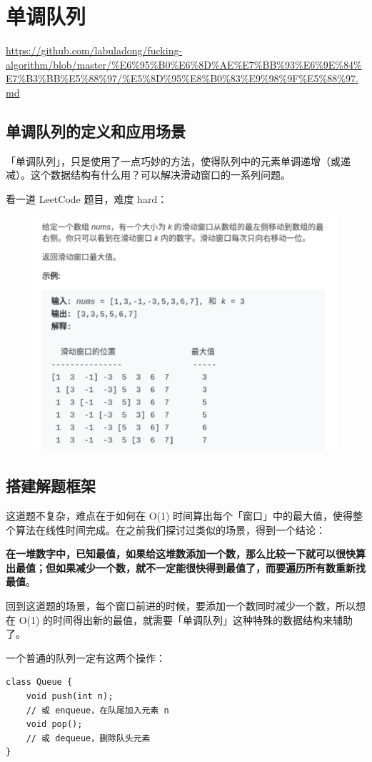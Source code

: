 \documentclass[12pt]{article}
\begin{document}
\section{单调队列}
\url{https://github.com/labuladong/fucking-algorithm/blob/master/%E6%95%B0%E6%8D%AE%E7%BB%93%E6%9E%84%E7%B3%BB%E5%88%97/%E5%8D%95%E8%B0%83%E9%98%9F%E5%88%97.md}

\subsection{单调队列的定义和应用场景}
「单调队列」，只是使用了一点巧妙的方法，使得队列中的元素单调递增（或递减）。这个数据结构有什么用？可以解决滑动窗口的一系列问题。

看一道 LeetCode 题目，难度 hard：
\begin{figure}[H]
    \centering
    \includegraphics[width=.8\textwidth]{fig/monotonic_queue_1.png}
\end{figure}

\subsection{搭建解题框架}
这道题不复杂，难点在于如何在 O(1) 时间算出每个「窗口」中的最大值，使得整个算法在线性时间完成。在之前我们探讨过类似的场景，得到一个结论：

\textbf{在一堆数字中，已知最值，如果给这堆数添加一个数，那么比较一下就可以很快算出最值；但如果减少一个数，就不一定能很快得到最值了，而要遍历所有数重新找最值}。

回到这道题的场景，每个窗口前进的时候，要添加一个数同时减少一个数，所以想在 O(1) 的时间得出新的最值，就需要「单调队列」这种特殊的数据结构来辅助了。

一个普通的队列一定有这两个操作：
\begin{lstlisting}
class Queue {
    void push(int n);
    // 或 enqueue，在队尾加入元素 n
    void pop();
    // 或 dequeue，删除队头元素
}
\end{lstlisting}
\end{document}
